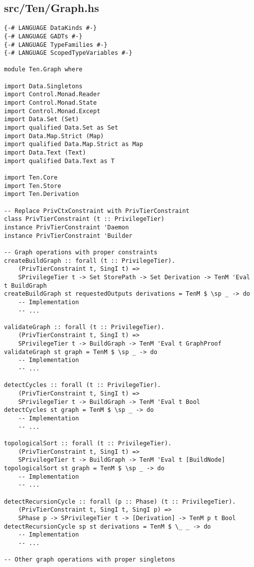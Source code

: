 \documentclass{article}
\begin{document}
\subsection{src/Ten/Graph.hs}

\begin{tcolorbox}[title=Ten/Graph.hs Changes]
\begin{verbatim}
{-# LANGUAGE DataKinds #-}
{-# LANGUAGE GADTs #-}
{-# LANGUAGE TypeFamilies #-}
{-# LANGUAGE ScopedTypeVariables #-}

module Ten.Graph where

import Data.Singletons
import Control.Monad.Reader
import Control.Monad.State
import Control.Monad.Except
import Data.Set (Set)
import qualified Data.Set as Set
import Data.Map.Strict (Map)
import qualified Data.Map.Strict as Map
import Data.Text (Text)
import qualified Data.Text as T

import Ten.Core
import Ten.Store
import Ten.Derivation

-- Replace PrivCtxConstraint with PrivTierConstraint
class PrivTierConstraint (t :: PrivilegeTier)
instance PrivTierConstraint 'Daemon
instance PrivTierConstraint 'Builder

-- Graph operations with proper constraints
createBuildGraph :: forall (t :: PrivilegeTier).
    (PrivTierConstraint t, SingI t) =>
    SPrivilegeTier t -> Set StorePath -> Set Derivation -> TenM 'Eval t BuildGraph
createBuildGraph st requestedOutputs derivations = TenM $ \sp _ -> do
    -- Implementation
    -- ...

validateGraph :: forall (t :: PrivilegeTier).
    (PrivTierConstraint t, SingI t) =>
    SPrivilegeTier t -> BuildGraph -> TenM 'Eval t GraphProof
validateGraph st graph = TenM $ \sp _ -> do
    -- Implementation
    -- ...

detectCycles :: forall (t :: PrivilegeTier).
    (PrivTierConstraint t, SingI t) =>
    SPrivilegeTier t -> BuildGraph -> TenM 'Eval t Bool
detectCycles st graph = TenM $ \sp _ -> do
    -- Implementation
    -- ...

topologicalSort :: forall (t :: PrivilegeTier).
    (PrivTierConstraint t, SingI t) =>
    SPrivilegeTier t -> BuildGraph -> TenM 'Eval t [BuildNode]
topologicalSort st graph = TenM $ \sp _ -> do
    -- Implementation
    -- ...

detectRecursionCycle :: forall (p :: Phase) (t :: PrivilegeTier).
    (PrivTierConstraint t, SingI t, SingI p) =>
    SPhase p -> SPrivilegeTier t -> [Derivation] -> TenM p t Bool
detectRecursionCycle sp st derivations = TenM $ \_ _ -> do
    -- Implementation
    -- ...

-- Other graph operations with proper singletons
\end{verbatim}
\end{tcolorbox}
\end{document}
